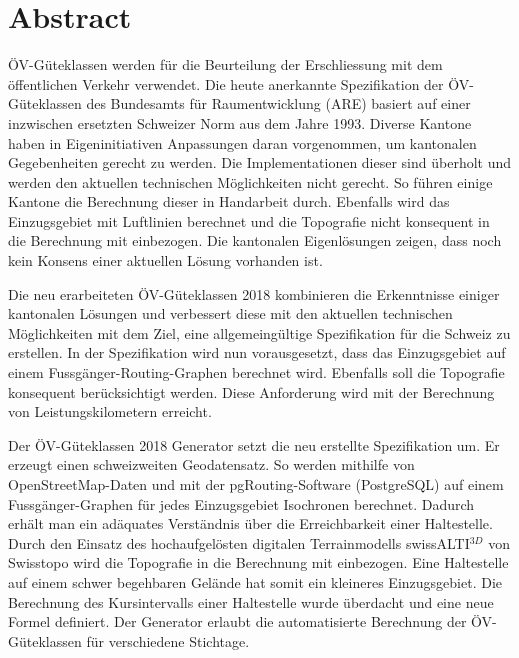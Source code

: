 
\chapter*{Abstract}
ÖV-Güteklassen werden für die Beurteilung der Erschliessung mit dem öffentlichen Verkehr verwendet.
Die heute anerkannte Spezifikation der ÖV-Güteklassen des Bundesamts für Raumentwicklung (ARE)  basiert auf einer inzwischen ersetzten Schweizer Norm aus dem Jahre 1993.
Diverse Kantone haben in Eigeninitiativen Anpassungen daran vorgenommen, um kantonalen Gegebenheiten gerecht zu werden.
Die Implementationen dieser sind überholt und werden den aktuellen technischen Möglichkeiten nicht gerecht.
So führen einige Kantone die Berechnung dieser in Handarbeit durch.
Ebenfalls wird das Einzugsgebiet mit Luftlinien berechnet und die Topografie nicht konsequent in die Berechnung mit einbezogen.
Die kantonalen Eigenlösungen zeigen, dass noch kein Konsens einer aktuellen Lösung vorhanden ist.

Die neu erarbeiteten ÖV-Güteklassen 2018 kombinieren die Erkenntnisse einiger kantonalen Lösungen und verbessert diese mit den aktuellen technischen Möglichkeiten mit dem Ziel, eine allgemeingültige Spezifikation für die Schweiz zu erstellen.
In der Spezifikation wird nun vorausgesetzt, dass das Einzugsgebiet auf einem Fussgänger-Routing-Graphen berechnet wird.
Ebenfalls soll die Topografie konsequent berücksichtigt werden.
Diese Anforderung wird mit der Berechnung von Leistungskilometern erreicht.

Der ÖV-Güteklassen 2018 Generator setzt die neu erstellte Spezifikation um.
Er erzeugt einen schweizweiten Geodatensatz.
So werden mithilfe von OpenStreetMap-Daten und mit der pgRouting-Software (PostgreSQL) auf einem Fussgänger-Graphen für jedes Einzugsgebiet Isochronen berechnet.
Dadurch erhält man ein adäquates Verständnis über die Erreichbarkeit einer Haltestelle.
Durch den Einsatz des hochaufgelösten digitalen Terrainmodells swissALTI$^{3D}$ von Swisstopo wird die Topografie in die Berechnung mit einbezogen.
Eine Haltestelle auf einem schwer begehbaren Gelände hat somit ein kleineres Einzugsgebiet.
Die Berechnung des Kursintervalls einer Haltestelle wurde überdacht und eine neue Formel definiert.
Der Generator erlaubt die automatisierte Berechnung der ÖV-Güteklassen für verschiedene Stichtage.

